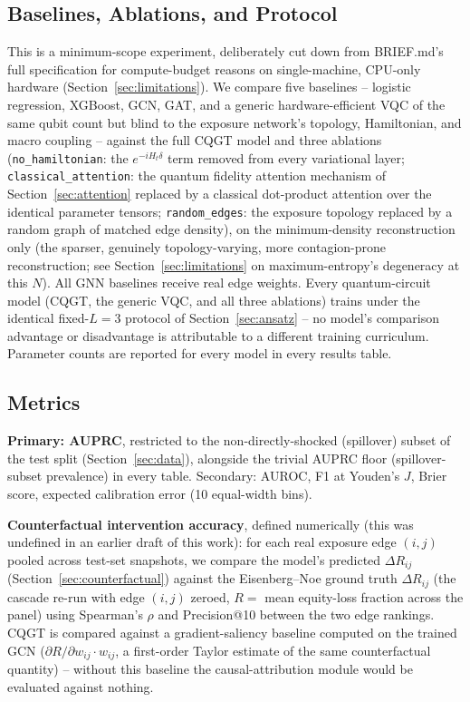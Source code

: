 \documentclass[journal]{IEEEtran}
\begin{document}
\subsection{Baselines, Ablations, and Protocol}
\label{sec:baselines}

This is a minimum-scope experiment, deliberately cut down from
BRIEF.md's full specification for compute-budget reasons on
single-machine, CPU-only hardware (Section~\ref{sec:limitations}). We
compare five baselines -- logistic regression, XGBoost, GCN, GAT, and a
generic hardware-efficient VQC of the same qubit count but blind to the
exposure network's topology, Hamiltonian, and macro coupling -- against
the full CQGT model and three ablations (\texttt{no\_hamiltonian}: the
$e^{-iH_t\delta}$ term removed from every variational layer;
\texttt{classical\_attention}: the quantum fidelity attention mechanism
of Section~\ref{sec:attention} replaced by a classical dot-product
attention over the identical parameter tensors; \texttt{random\_edges}:
the exposure topology replaced by a random graph of matched edge
density), on the minimum-density reconstruction only (the sparser,
genuinely topology-varying, more contagion-prone reconstruction; see
Section~\ref{sec:limitations} on maximum-entropy's degeneracy at this
$N$). All GNN baselines receive real edge weights. Every quantum-circuit
model (CQGT, the generic VQC, and all three ablations) trains under the
identical fixed-$L{=}3$ protocol of Section~\ref{sec:ansatz} -- no
model's comparison advantage or disadvantage is attributable to a
different training curriculum. Parameter counts are reported for every
model in every results table.

\subsection{Metrics}
\label{sec:metrics}

\textbf{Primary: AUPRC}, restricted to the non-directly-shocked
(spillover) subset of the test split (Section~\ref{sec:data}), alongside
the trivial AUPRC floor (spillover-subset prevalence) in every table.
Secondary: AUROC, F1 at Youden's $J$, Brier score, expected calibration
error (10 equal-width bins).

\textbf{Counterfactual intervention accuracy}, defined numerically (this
was undefined in an earlier draft of this work): for each real exposure
edge $(i,j)$ pooled across test-set snapshots, we compare the model's
predicted $\Delta R_{ij}$ (Section~\ref{sec:counterfactual}) against the
Eisenberg--Noe ground truth $\Delta R_{ij}$ (the cascade re-run with edge
$(i,j)$ zeroed, $R = $ mean equity-loss fraction across the panel) using
Spearman's $\rho$ and Precision@10 between the two edge rankings. CQGT is
compared against a gradient-saliency baseline computed on the trained
GCN ($\partial R/\partial w_{ij} \cdot w_{ij}$, a first-order Taylor
estimate of the same counterfactual quantity) -- without this baseline
the causal-attribution module would be evaluated against nothing.
\end{document}
